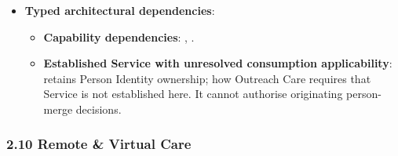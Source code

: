 \begin{itemize}
\begin{itemize}
\begin{itemize}
\item 
\emph{Function}: \texttt{} — Reconciles and merges clinical documentation recorded during disconnected remote clinic operations.



\item 
\emph{Exposed Service}: \texttt{} — Reconciles batch clinical encounters upon network reconnection.



\end{itemize}


\end{itemize}


\item 
\textbf{Typed architectural dependencies}:


\begin{itemize}

\item 
\textbf{Capability dependencies}: \texttt{}, \texttt{}.



\item 
\textbf{Established Service with unresolved consumption applicability}: \texttt{} retains Person Identity ownership; how Outreach Care requires that Service is not established here. It cannot authorise originating person-merge decisions.



\end{itemize}


\end{itemize}
\label{rad:sd:216}

\par\smallskip
{}\label{rad:sd:218}



\label{rad:sd:220}
\subsubsection*{2.10 Remote \& Virtual Care}
\label{rad:sd:221}

